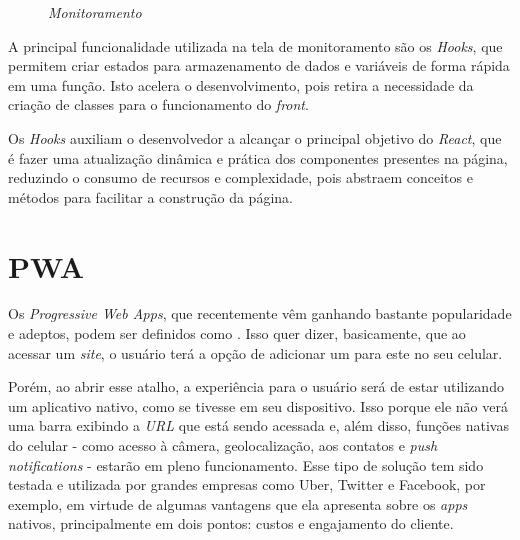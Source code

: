 \begin{figure}[!htb]
    \centering
    \caption{\textit{Monitoramento}}
    \label{fig:monitoramento}
\end{figure}

A principal funcionalidade utilizada na tela de monitoramento são os \textit{Hooks}, que permitem criar estados para armazenamento de dados e variáveis de forma rápida em uma função. Isto acelera o desenvolvimento, pois retira a necessidade da criação de classes para o funcionamento do \textit{front}.

Os \textit{Hooks} auxiliam o desenvolvedor a alcançar o principal objetivo do \textit{React}, que é fazer uma atualização dinâmica e prática dos componentes presentes na página, reduzindo o consumo de recursos e complexidade, pois abstraem conceitos e métodos para facilitar a construção da página.

\section{PWA}
\label{sec:pwa}

Os \textit{Progressive Web Apps}, que recentemente vêm ganhando bastante popularidade e adeptos, podem ser definidos como \cite{Souza19} . Isso quer dizer, basicamente, que ao acessar um \textit{site}, o usuário terá a opção de adicionar um  para este no seu celular.

Porém, ao abrir esse atalho, a experiência para o usuário será de estar utilizando um aplicativo nativo, como se tivesse  em seu dispositivo. Isso porque ele não verá uma barra exibindo a \textit{URL} que está sendo acessada e, além disso, funções nativas do celular - como acesso à câmera, geolocalização, aos contatos e \textit{push notifications} - estarão em pleno funcionamento. Esse tipo de solução tem sido testada e utilizada por grandes empresas como Uber, Twitter e Facebook, por exemplo, em virtude de algumas vantagens que ela apresenta sobre os \textit{apps} nativos, principalmente em dois pontos: custos e engajamento do cliente.


